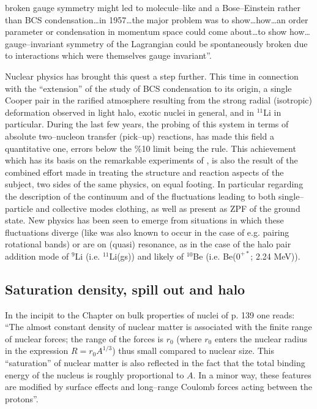 \begin{subappendices}
broken gauge symmetry might led to molecule--like and a Bose--Einstein rather than BCS condensation\dots in 1957\dots the major problem was to show\dots how\dots an order parameter or condensation in momentum space could come about\dots to show how\dots gauge--invariant symmetry of the Lagrangian could be spontaneously broken due to interactions which were themselves gauge invariant''.


Nuclear physics has brought this quest a step further. This time in connection with the ``extension'' of the study of BCS condensation to its origin, a single Cooper pair in the rarified atmosphere resulting from the strong radial (isotropic) deformation observed in light halo, exotic nuclei in general, and in $^{11}$Li in particular. During the last few years, the probing of this system in terms of absolute two--nucleon transfer (pick--up) reactions, has made this field a quantitative one, errors below the \%10 limit being the rule. This achievement which has its basis on the remarkable experiments of \cite{Tanihata:08}, is also the result of the combined effort made in treating the structure and reaction aspects of the subject, two sides of the same physics, on equal footing. In particular regarding the description of the continuum and of the fluctuations leading to both  single--particle and collective modes clothing, as well as present as ZPF of the ground state. New physics has been seen to emerge from situations in which these fluctuations diverge (like was also known to occur in the case of e.g. pairing rotational bands) or are on (quasi) resonance, as in the case of the halo pair addition mode of $^9$Li (i.e. $^{11}$Li(gs)) and likely of $^{10}$Be (i.e. Be($0^{+*}$; 2.24 MeV)).
\subsection{Saturation density, spill out and halo}
In the incipit to the Chapter on bulk properties of nuclei of \cite{Bohr:69} p. 139 one reads: ``The almost constant density of nuclear matter is associated with the finite range of nuclear forces; the range of the forces is $r_0$ (where $r_0$ enters the nuclear radius in the expression $R=r_0A^{1/3}$) thus small compared to nuclear size. This ``saturation'' of nuclear matter is also reflected in the fact that the total binding energy of the nucleus is roughly proportional to $A$. In a minor way, these features are modified by surface effects and long--range Coulomb forces acting between the protons''.




\end{subappendices}
